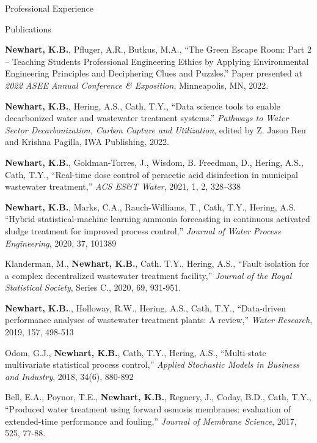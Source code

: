 \documentclass{resume} %
\begin{document}
\begin{rSection}{Professional Experience}
\begin{rSection}{Publications}
\begin{etaremune}
	\item\textbf{Newhart, K.B.}, Pfluger, A.R., Butkus, M.A., ``The Green Escape Room: Part 2 – Teaching Students Professional Engineering Ethics by Applying Environmental Engineering Principles and Deciphering Clues and Puzzles.'' Paper presented at \emph{2022 ASEE Annual Conference \& Exposition}, Minneapolis, MN, 2022.

	\item \textbf{Newhart, K.B.}, Hering, A.S., Cath, T.Y., ``Data science tools to enable decarbonized water and wastewater treatment systems.'' \emph{Pathways to Water Sector Decarbonization, Carbon Capture and Utilization}, edited by Z. Jason Ren and Krishna Pagilla, IWA Publishing, 2022.

	\item \textbf{Newhart, K.B.}, Goldman-Torres, J., Wisdom, B. Freedman, D., Hering, A.S., Cath, T.Y., ``Real-time dose control of peracetic acid disinfection in municipal wastewater treatment,'' \emph{ACS ES\&T Water}, 2021, 1, 2, 328–338

	\item \textbf{Newhart, K.B.}, Marks, C.A., Rauch-Williams, T., Cath, T.Y., Hering, A.S. ``Hybrid statistical-machine learning ammonia forecasting in continuous activated sludge treatment for improved process control,'' \emph{Journal of Water Process Engineering}, 2020, 37, 101389

	\item Klanderman, M., \textbf{Newhart, K.B.}, Cath. T.Y., Hering, A.S., ``Fault isolation for a complex decentralized wastewater treatment facility,'' \emph{Journal of the Royal Statistical Society}, Series C., 2020, 69, 931-951.

	\item \textbf{Newhart, K.B.}., Holloway, R.W., Hering, A.S., Cath, T.Y., ``Data-driven performance analyses of wastewater treatment plants: A review,'' \emph{Water Research}, 2019, 157, 498-513

	\item Odom, G.J., \textbf{Newhart, K.B.}, Cath, T.Y., Hering, A.S., ``Multi-state multivariate statistical process control,'' \emph{Applied Stochastic Models in Business and Industry}, 2018, 34(6), 880-892

	\item Bell, E.A., Poynor, T.E., \textbf{Newhart, K.B.}, Regnery, J., Coday, B.D., Cath, T.Y., ``Produced water treatment using forward osmosis membranes: evaluation of extended-time performance and fouling,'' \emph{Journal of Membrane Science}, 2017, 525, 77-88.
\end{etaremune}


\end{rSection}
\end{rSection}
\end{document}

